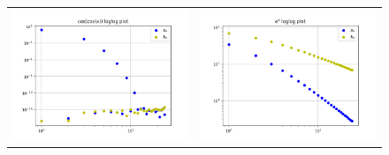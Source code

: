 \documentclass[11pt, a4paper, twoside]{article}
\begin{document}
\begin{figure}[H]
\begin{tabular}{cc}
                       \includegraphics[scale=0.5]{Plots/Figure 5.png} &
                       \includegraphics[scale=0.5]{Plots/Figure 6.png}\\
                    \end{tabular}
                \end{figure}
\end{document}
